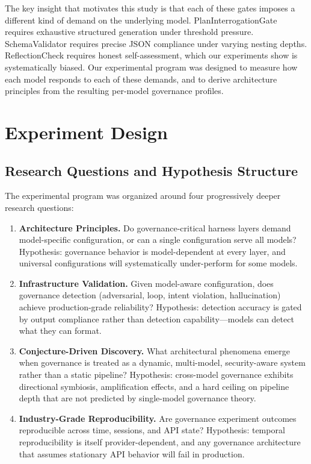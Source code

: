 \documentclass[11pt,a4paper]{article}
\begin{document}
The key insight that motivates this study is that each of these gates imposes a different kind of demand on the underlying model. PlanInterrogationGate requires exhaustive structured generation under threshold pressure. SchemaValidator requires precise JSON compliance under varying nesting depths. ReflectionCheck requires honest self-assessment, which our experiments show is systematically biased. Our experimental program was designed to measure how each model responds to each of these demands, and to derive architecture principles from the resulting per-model governance profiles.

\section{Experiment Design}

\subsection{Research Questions and Hypothesis Structure}

The experimental program was organized around four progressively deeper research questions:

\begin{enumerate}[label=\textbf{RQ\arabic*:}, leftmargin=*]
\item \textbf{Architecture Principles.} Do governance-critical harness layers demand model-specific configuration, or can a single configuration serve all models? Hypothesis: governance behavior is model-dependent at every layer, and universal configurations will systematically under-perform for some models.
\item \textbf{Infrastructure Validation.} Given model-aware configuration, does governance detection (adversarial, loop, intent violation, hallucination) achieve production-grade reliability? Hypothesis: detection accuracy is gated by output compliance rather than detection capability---models can detect what they can format.
\item \textbf{Conjecture-Driven Discovery.} What architectural phenomena emerge when governance is treated as a dynamic, multi-model, security-aware system rather than a static pipeline? Hypothesis: cross-model governance exhibits directional symbiosis, amplification effects, and a hard ceiling on pipeline depth that are not predicted by single-model governance theory.
\item \textbf{Industry-Grade Reproducibility.} Are governance experiment outcomes reproducible across time, sessions, and API state? Hypothesis: temporal reproducibility is itself provider-dependent, and any governance architecture that assumes stationary API behavior will fail in production.
\end{enumerate}
\end{document}
